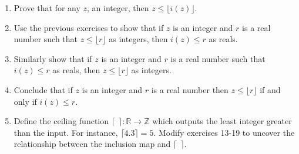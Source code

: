 \documentclass{article}
\theoremstyle{problemstyle}
\begin{document}
\begin{enumerate}
\item Prove that for any $z$, an integer, then $z \leq \lfloor i(z) \rfloor$.  
\item Use the previous exercises to show that if $z$ is an integer and $r$ is a real number such that $z \leq \lfloor r \rfloor$ as integers, then $i(z) \leq r$ as reals. 
\item Similarly show that if $z$ is an integer and $r$ is a real number such that $i(z) \leq r$ as reals, then $z \leq \lfloor r \rfloor$ as integers. 
\item Conclude that if $z$ is an integer and $r$ is a real number then $z \leq \lfloor r \rfloor$ if and only if $i(z) \leq r$. 
\item Define the ceiling function $\lceil \ \ \rceil : \mathbb{R} \rightarrow \mathbb{Z}$ which outputs the least integer greater than the input. For instance, $\lceil 4.3 \rceil = 5$. Modify exercises 13-19 to uncover the relationship between the inclusion map and $\lceil \ \ \rceil$. 

\end{enumerate}
\end{document}
